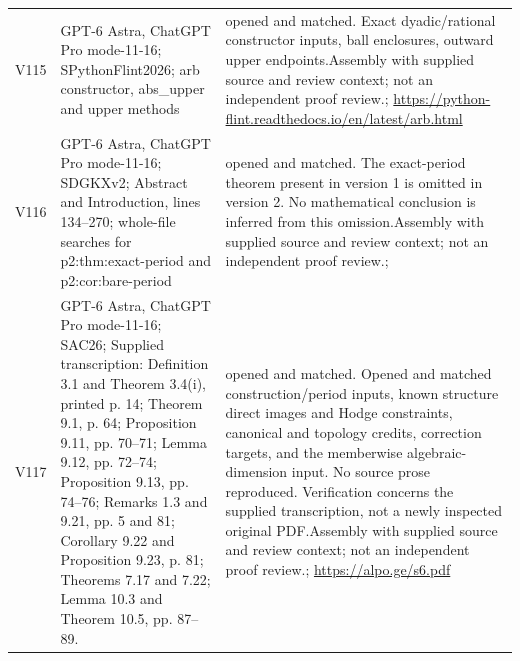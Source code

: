 \begin{longtable}{@{}L{.08\linewidth}L{.31\linewidth}L{.56\linewidth}@{}}
V115 & GPT-6 Astra, ChatGPT Pro mode-11-16; S\newline PythonFlint2026; arb constructor, abs\_\allowbreak{}upper and upper methods & opened and matched. Exact dyadic/\allowbreak{}rational constructor inputs, ball enclosures, outward upper endpoints.\newline Assembly with supplied source and review context; not an independent proof review.\newline {}; \url{https://python-flint.readthedocs.io/en/latest/arb.html}\\
V116 & GPT-6 Astra, ChatGPT Pro mode-11-16; S\newline DGKXv2; Abstract and Introduction, lines 134--270; whole-file searches for p2:\allowbreak{}thm:\allowbreak{}exact-period and p2:\allowbreak{}cor:\allowbreak{}bare-period & opened and matched. The exact-period theorem present in version 1 is omitted in version 2. No mathematical conclusion is inferred from this omission.\newline Assembly with supplied source and review context; not an independent proof review.\newline {}; \\
V117 & GPT-6 Astra, ChatGPT Pro mode-11-16; S\newline AC26; Supplied transcription:\allowbreak{} Definition 3.1 and Theorem 3.4(i), printed p. 14; Theorem 9.1, p. 64; Proposition 9.11, pp. 70--71; Lemma 9.12, pp. 72--74; Proposition 9.13, pp. 74--76; Remarks 1.3 and 9.21, pp. 5 and 81; Corollary 9.22 and Proposition 9.23, p. 81; Theorems 7.17 and 7.22; Lemma 10.3 and Theorem 10.5, pp. 87--89. & opened and matched. Opened and matched construction/\allowbreak{}period inputs, known structure direct images and Hodge constraints, canonical and topology credits, correction targets, and the memberwise algebraic-dimension input. No source prose reproduced. Verification concerns the supplied transcription, not a newly inspected original PDF.\newline Assembly with supplied source and review context; not an independent proof review.\newline {}; \url{https://alpo.ge/s6.pdf}\\

\end{longtable}
